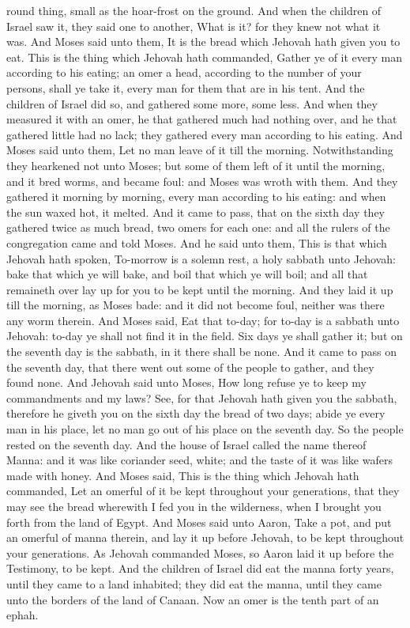 round thing, small as the hoar-frost on the ground. And when the children of Israel saw it, they said one to another, What is it? for they knew not what it was. And Moses said unto them, It is the bread which Jehovah hath given you to eat. This is the thing which Jehovah hath commanded, Gather ye of it every man according to his eating; an omer a head, according to the number of your persons, shall ye take it, every man for them that are in his tent. And the children of Israel did so, and gathered some more, some less. And when they measured it with an omer, he that gathered much had nothing over, and he that gathered little had no lack; they gathered every man according to his eating. And Moses said unto them, Let no man leave of it till the morning. Notwithstanding they hearkened not unto Moses; but some of them left of it until the morning, and it bred worms, and became foul: and Moses was wroth with them.  And they gathered it morning by morning, every man according to his eating: and when the sun waxed hot, it melted. And it came to pass, that on the sixth day they gathered twice as much bread, two omers for each one: and all the rulers of the congregation came and told Moses. And he said unto them, This is that which Jehovah hath spoken, To-morrow is a solemn rest, a holy sabbath unto Jehovah: bake that which ye will bake, and boil that which ye will boil; and all that remaineth over lay up for you to be kept until the morning. And they laid it up till the morning, as Moses bade: and it did not become foul, neither was there any worm therein. And Moses said, Eat that to-day; for to-day is a sabbath unto Jehovah: to-day ye shall not find it in the field. Six days ye shall gather it; but on the seventh day is the sabbath, in it there shall be none. And it came to pass on the seventh day, that there went out some of the people to gather, and they found none. And Jehovah said unto Moses, How long refuse ye to keep my commandments and my laws? See, for that Jehovah hath given you the sabbath, therefore he giveth you on the sixth day the bread of two days; abide ye every man in his place, let no man go out of his place on the seventh day. So the people rested on the seventh day.  And the house of Israel called the name thereof Manna: and it was like coriander seed, white; and the taste of it was like wafers made with honey. And Moses said, This is the thing which Jehovah hath commanded, Let an omerful of it be kept throughout your generations, that they may see the bread wherewith I fed you in the wilderness, when I brought you forth from the land of Egypt. And Moses said unto Aaron, Take a pot, and put an omerful of manna therein, and lay it up before Jehovah, to be kept throughout your generations. As Jehovah commanded Moses, so Aaron laid it up before the Testimony, to be kept. And the children of Israel did eat the manna forty years, until they came to a land inhabited; they did eat the manna, until they came unto the borders of the land of Canaan. Now an omer is the tenth part of an ephah. 

